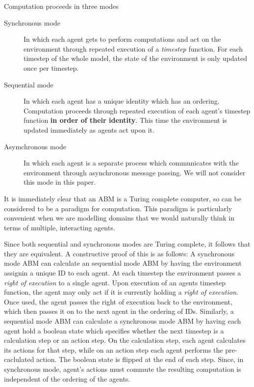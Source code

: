 \documentclass[letterpaper,twocolumn,10pt]{article}
\begin{document}
Computation proceeds in three modes
\begin{description}

\item[Synchronous mode] In which each agent gets to perform computations and act on the environment through repeated execution of a \textit{timestep} function. For each timestep of the whole model, the state of the environment is only updated once per timestep.

\item[Sequential mode] In which each agent has a unique identity which has an ordering. Computation proceeds through repeated execution of each agent's timestep function \textbf{in order of their identity}. This time the environment is updated immediately as agents act upon it.

\item[Asymchronous mode] In which each agent is a separate process which communicates with the environment through asynchronous message passing. We will not consider this mode in this paper.

\end{description}

It is immediately clear that an ABM is a Turing complete computer, so can be considered to be a paradigm for computation. This paradigm is particularly convenient when we are modelling domains that we would naturally think in terms of multiple, interacting agents.

Since both sequential and synchronous modes are Turing complete, it follows that they are equivalent. A constructive proof of this is as follows: A synchronous mode ABM can calculate an sequential mode ABM by having the environment assignin a unique ID to each agent. At each timestep the environment passes a \textit{right of execution} to a single agent. Upon execution of an agents timestep function, the agent may only act if it is currently holding a \textit{right of execution}. Once used, the agent passes the right of execution back to the environment, which then passes it on to the next agent in the ordering of IDs. Similarly, a sequential mode ABM can calculate a synchronous mode ABM by having each agent hold a boolean state which specifies whether the next timestep is a calculation step or an action step. On the calculation step, each agent calculates its actions for that step, while on an action step each agent performs the pre-caclulated action. The boolean state is flipped at the end of each step. Since, in synchronous mode, agent's actions must commute the resulting computation is independent of the ordering of the agents.
\end{document}
